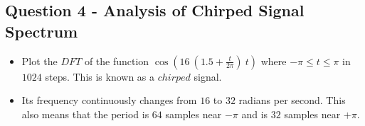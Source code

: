 \documentclass[11pt, a4paper]{article}
\begin{document}
\subsection{Question 4 - Analysis of Chirped Signal
Spectrum}\label{question-5---analysis-of-chirped-signal-spectrum}

\begin{itemize}

\item
  Plot the \(DFT\) of the function
  \(\cos(16 \ (1.5 + \frac{t}{2\pi}) \ t)\) where
  \(-\pi \leq t \leq \pi\) in \(1024\) steps. This is known as a
  \(chirped\) signal.
\item
  Its frequency continuously changes from \(16\) to \(32\) radians per
  second. This also means that the period is \(64\) samples near
  \(−\pi\) and is \(32\) samples near \(+\pi\).
\end{itemize}
\end{document}
